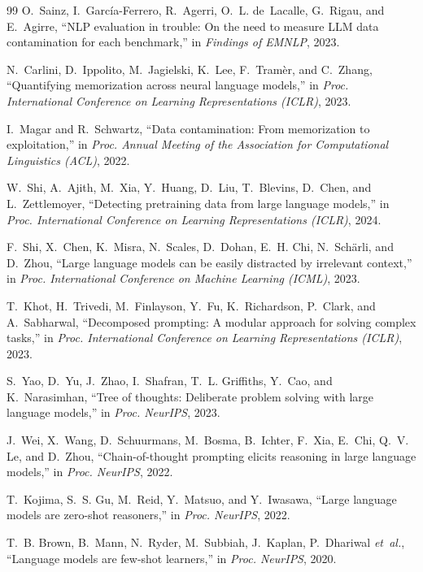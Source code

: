 \documentclass[conference]{IEEEtran}
\begin{document}
\begin{thebibliography}{99}
O.~Sainz, I.~Garc\'ia-Ferrero, R.~Agerri, O.~L. de~Lacalle, G.~Rigau, and E.~Agirre, ``NLP evaluation in trouble: On the need to measure LLM data contamination for each benchmark,'' in \emph{Findings of EMNLP}, 2023.

N.~Carlini, D.~Ippolito, M.~Jagielski, K.~Lee, F.~Tram\`er, and C.~Zhang, ``Quantifying memorization across neural language models,'' in \emph{Proc. International Conference on Learning Representations (ICLR)}, 2023.

I.~Magar and R.~Schwartz, ``Data contamination: From memorization to exploitation,'' in \emph{Proc. Annual Meeting of the Association for Computational Linguistics (ACL)}, 2022.

W.~Shi, A.~Ajith, M.~Xia, Y.~Huang, D.~Liu, T.~Blevins, D.~Chen, and L.~Zettlemoyer, ``Detecting pretraining data from large language models,'' in \emph{Proc. International Conference on Learning Representations (ICLR)}, 2024.

F.~Shi, X.~Chen, K.~Misra, N.~Scales, D.~Dohan, E.~H. Chi, N.~Sch\"arli, and D.~Zhou, ``Large language models can be easily distracted by irrelevant context,'' in \emph{Proc. International Conference on Machine Learning (ICML)}, 2023.

T.~Khot, H.~Trivedi, M.~Finlayson, Y.~Fu, K.~Richardson, P.~Clark, and A.~Sabharwal, ``Decomposed prompting: A modular approach for solving complex tasks,'' in \emph{Proc. International Conference on Learning Representations (ICLR)}, 2023.

S.~Yao, D.~Yu, J.~Zhao, I.~Shafran, T.~L. Griffiths, Y.~Cao, and K.~Narasimhan, ``Tree of thoughts: Deliberate problem solving with large language models,'' in \emph{Proc. NeurIPS}, 2023.

J.~Wei, X.~Wang, D.~Schuurmans, M.~Bosma, B.~Ichter, F.~Xia, E.~Chi, Q.~V. Le, and D.~Zhou, ``Chain-of-thought prompting elicits reasoning in large language models,'' in \emph{Proc. NeurIPS}, 2022.

T.~Kojima, S.~S. Gu, M.~Reid, Y.~Matsuo, and Y.~Iwasawa, ``Large language models are zero-shot reasoners,'' in \emph{Proc. NeurIPS}, 2022.

T.~B. Brown, B.~Mann, N.~Ryder, M.~Subbiah, J.~Kaplan, P.~Dhariwal \emph{et~al.}, ``Language models are few-shot learners,'' in \emph{Proc. NeurIPS}, 2020.


\end{thebibliography}
\end{document}
